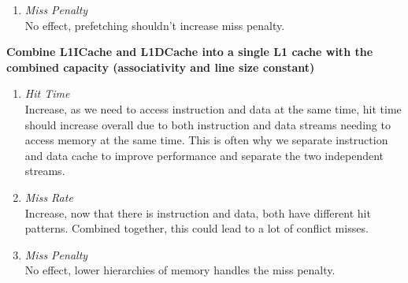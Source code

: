 \documentclass[11pt]{article}
\begin{document}
\begin{Parts}
\begin{enumerate}[i]
			\item \textit{Miss Penalty} \\
				No effect, prefetching shouldn't increase miss penalty.
		\end{enumerate}
	\Part \textbf{Combine L1ICache and L1DCache into a single L1 cache with the combined capacity
(associativity and line size constant)} \\
		\begin{enumerate}[i]
			\item \textit{Hit Time} \\
				Increase, as we need to access instruction and data at the same time, hit time should increase overall due to both instruction and data streams needing to access memory at the same time. This is often why we separate instruction and data cache to improve performance and separate the two independent streams.
			\item \textit{Miss Rate} \\
				Increase, now that there is instruction and data, both have different hit patterns. Combined together, this could lead to a lot of conflict misses.
			\item \textit{Miss Penalty} \\
				No effect, lower hierarchies of memory handles the miss penalty.
		\end{enumerate}
\end{Parts}
\newpage



\end{document}
